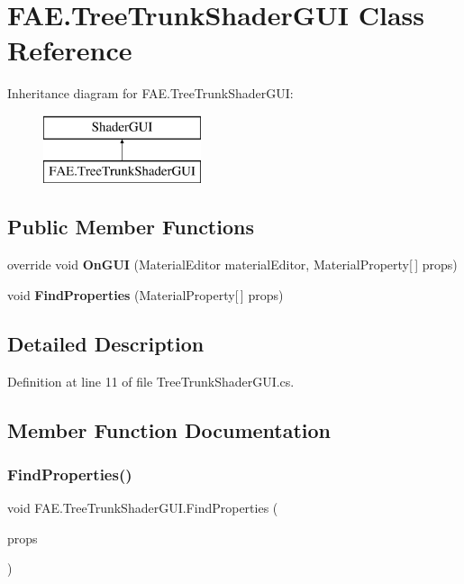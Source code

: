 \section{F\+A\+E.\+Tree\+Trunk\+Shader\+G\+UI Class Reference}
\label{class_f_a_e_1_1_tree_trunk_shader_g_u_i}
Inheritance diagram for F\+A\+E.\+Tree\+Trunk\+Shader\+G\+UI\+:\begin{figure}[H]
\begin{center}
\leavevmode
\includegraphics[height=2.000000cm]{class_f_a_e_1_1_tree_trunk_shader_g_u_i}
\end{center}
\end{figure}
\subsection*{Public Member Functions}
\begin{DoxyCompactItemize}
\item 
override void \textbf{ On\+G\+UI} (Material\+Editor material\+Editor, Material\+Property[$\,$] props)
\item 
void \textbf{ Find\+Properties} (Material\+Property[$\,$] props)
\end{DoxyCompactItemize}


\subsection{Detailed Description}


Definition at line 11 of file Tree\+Trunk\+Shader\+G\+U\+I.\+cs.



\subsection{Member Function Documentation}
\mbox{\label{class_f_a_e_1_1_tree_trunk_shader_g_u_i_a7413b90d1f52f67631eb329caf0fdb6f}} 
\subsubsection{Find\+Properties()}
{\footnotesize\ttfamily void F\+A\+E.\+Tree\+Trunk\+Shader\+G\+U\+I.\+Find\+Properties (\begin{DoxyParamCaption}\item[{Material\+Property [$\,$]}]{props }\end{DoxyParamCaption})}



